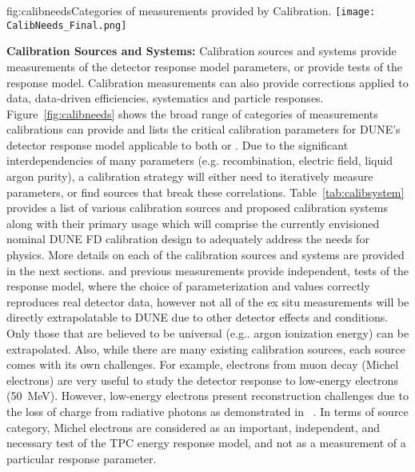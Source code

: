 \begin{dunefigure}{fig:calibneeds}{Categories of measurements provided by Calibration.}
\texttt{[image: CalibNeeds\_Final.png]}
\end{dunefigure}

\textbf{Calibration Sources and Systems:} Calibration sources and systems provide measurements of the detector response model parameters, or provide tests of the response model. 
Calibration measurements can also provide corrections applied to data, data-driven efficiencies, systematics and particle responses. Figure~\ref{fig:calibneeds} shows the broad range of categories of measurements calibrations can provide and lists the critical calibration parameters for DUNE's detector response model applicable to both  or . Due to the significant interdependencies of many parameters (e.g. recombination, electric field, liquid argon purity), a calibration strategy will either need to iteratively measure parameters, or find sources that break these correlations. Table~\ref{tab:calibsystem} provides a list of various calibration sources and proposed calibration systems along with their primary usage which will comprise the currently envisioned nominal DUNE FD calibration design to adequately address the needs for physics. More details on each of the calibration sources and systems are provided in the next sections.  and previous measurements provide independent, tests of the response model, where the choice of parameterization and values correctly reproduces real detector data, however not all of the ex situ measurements will be directly extrapolatable to DUNE due to other detector effects and conditions. Only those that are believed to be universal (e.g.. argon ionization energy) can be extrapolated. Also, while there are many existing calibration sources, each source comes with its own challenges. For example, electrons from muon decay (Michel electrons) are very useful to study the detector response to low-energy electrons (\SI{50}{\MeV}). However, low-energy electrons present reconstruction challenges due to the loss of charge from radiative photons as demonstrated in ~\cite{Acciarri:2017sjy}. In terms of source category, Michel electrons are considered as an important, independent, and necessary test of the TPC energy response model, and not as a measurement of a particular response parameter.

